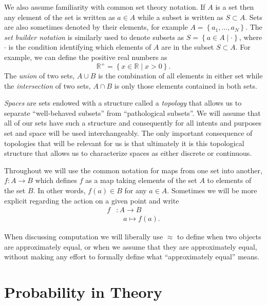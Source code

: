 \documentclass[11pt, oneside]{article}
\newcommand{\RR}{ \mathbb{R} }
\begin{document}
We also assume familiarity with common set theory notation.  If $A$ is a set
then any element of the set is written as $a \in A$ while a subset is written
as $S \subset A$.  Sets are also sometimes denoted by their elements, for
example $A = \left\{ a_{1}, \ldots, a_{N} \right\}$.  The \emph{set builder
notation} is similarly used to denote subsets as 
$S = \left\{ a \in A \mid \cdot \right\}$, where $\cdot$ is the condition identifying
which elements of $A$ are in the subset $S \subset A$.  For example, we
can define the positive real numbers as 
%
\begin{equation*}
\RR^{+} = \left\{ x \in \RR \mid x > 0 \right\}.
\end{equation*}
%
The \emph{union} of two sets, $A \cup B$ is the combination of all 
elements in either set while the \emph{intersection} of two sets, 
$A \cap B$ is only those elements contained in both sets.

\emph{Spaces} are sets endowed with a structure called a 
\emph{topology} that allows us to separate ``well-behaved subsets''
from ``pathological subsets''.  We will assume that all of our sets
have such a structure and consequently for all intents and purposes 
set and space will be used interchangeably.  The only important
consequence of topologies that will be relevant for us is that ultimately
it is this topological structure that allows us to characterize spaces as 
either discrete or continuous.

Throughout we will use the common notation for maps from one set into 
another, $f : A \rightarrow B$ which defines $f$ as a map taking elements 
of the set $A$ to elements of the set $B$. In other words, $f(a) \in B$ for 
any $a \in A$.  Sometimes we will be more explicit regarding the action
on a given point and write
%
\begin{align*}
f &: A \rightarrow B \\
  &\quad a \mapsto f \! \left( a \right).
\end{align*}

When discussing computation we will liberally use $\approx$ to define
when two objects are approximately equal, or when we assume that
they are approximately equal, without making any effort to formally define
what ``approximately equal'' means.

\section{Probability in Theory}
\end{document}

